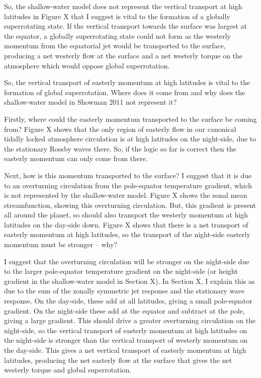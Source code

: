 So, the shallow-water model does not represent the vertical transport at high latitudes in Figure X that I suggest is vital to the formation of a globally superrotating state. If the vertical transport towards the surface was largest at the equator, a globally superrotating state could not form as the westerly momentum from the equatorial jet would be transported to the surface, producing a net westerly flow at the surface and a net westerly torque on the atmosphere which would oppose global superrotation.

So, the vertical transport of easterly momentum at high latitudes is vital to the formation of global superrotation. Where does it come from and why does the shallow-water model in Showman 2011 not represent it?

Firstly, where could the easterly momentum transported to the surface be coming from? Figure X shows that the only region of easterly flow in our canonical tidally locked atmosphere circulation is at high latitudes on the night-side, due to the stationary Rossby waves there. So, if the logic so far is correct then the easterly momentum can only come from there.

Next, how is this momentum transported to the surface? I suggest that it is due to an overturning circulation from the pole-equator temperature gradient, which is not represented by the shallow-water model. Figure X shows the zonal mean streamfunction, showing this overturning circulation. But, this gradient is present all around the planet, so should also transport the westerly momentum at high latitudes on the day-side down. Figure X shows that there is a net transport of easterly momentum at high latitudes, so the transport of the night-side easterly momentum must be stronger -- why?

I suggest that the overturning circulation will be stronger on the night-side due to the larger pole-equator temperature gradient on the night-side (or height gradient in the shallow-water model in Section X). In Section X, I explain this as due to the sum of the zonally symmetric jet response and the stationary wave response. On the day-side, these add at all latitudes, giving a small pole-equator gradient. On the night-side these add at the equator and subtract at the pole, giving a large gradient. This should drive a greater overturning circulation on the night-side, so the vertical transport of easterly momentum at high latitudes on the night-side is stronger than the vertical transport of westerly momentum on the day-side. This gives a net vertical transport of easterly momentum at high latitudes, producing the net easterly flow at the surface that gives the net westerly torque and global superrotation.

